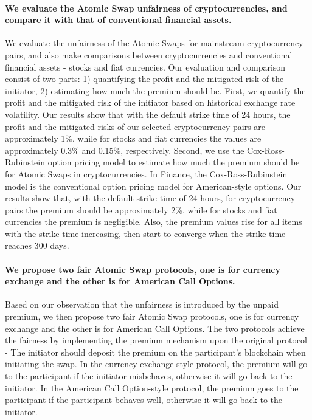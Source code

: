 \paragraph{We evaluate the Atomic Swap unfairness of cryptocurrencies, and compare it with that of conventional financial assets.}
We evaluate the unfairness of the Atomic Swaps for mainstream cryptocurrency pairs, and also make comparisons between cryptocurrencies and conventional financial assets - stocks and fiat currencies.
Our evaluation and comparison consist of two parts: 1) quantifying the profit and the mitigated risk of the initiator, 2) estimating how much the premium should be.
First, we quantify the profit and the mitigated risk of the initiator based on historical exchange rate volatility.
Our results show that with the default strike time of 24 hours, the profit and the mitigated risks of our selected cryptocurrency pairs are approximately 1\%, while for stocks and fiat currencies the values are approximately 0.3\% and 0.15\%, respectively.
Second, we use the Cox-Ross-Rubinstein option pricing model to estimate how much the premium should be for Atomic Swaps in cryptocurrencies.
In Finance, the Cox-Ross-Rubinstein model is the conventional option pricing model for American-style options.
Our results show that, with the default strike time of 24 hours, for cryptocurrency pairs the premium should be approximately 2\%, while for stocks and fiat currencies the premium is negligible.
Also, the premium values rise for all items with the strike time increasing, then start to converge when the strike time reaches 300 days.

\paragraph{We propose two fair Atomic Swap protocols, one is for currency exchange and the other is for American Call Options.}
Based on our observation that the unfairness is introduced by the unpaid premium,
we then propose two fair Atomic Swap protocols, one is for currency exchange and the other is for American Call Options.
The two protocols achieve the fairness by implementing the premium mechanism upon the original protocol - The initiator should deposit the premium on the participant's blockchain when initiating the swap.
In the currency exchange-style protocol, the premium will go to the participant if the initiator misbehaves, otherwise it will go back to the initiator.
In the American Call Option-style protocol, the premium goes to the participant if the participant behaves well, otherwise it will go back to the initiator.


